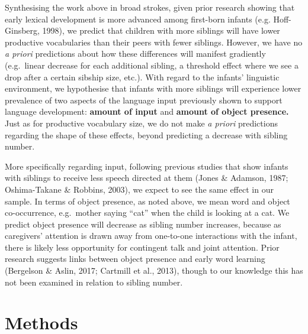 \documentclass[
  man,mask,floatsintext]{apa6}
\begin{document}
Synthesising the work above in broad strokes, given prior research showing that early lexical development is more advanced among first-born infants (e.g. Hoff-Ginsberg, 1998), we predict that children with more siblings will have lower productive vocabularies than their peers with fewer siblings. However, we have no \emph{a priori} predictions about how these differences will manifest gradiently (e.g.~linear decrease for each additional sibling, a threshold effect where we see a drop after a certain sibship size, etc.). With regard to the infants' linguistic environment, we hypothesise that infants with more siblings will experience lower prevalence of two aspects of the language input previously shown to support language development: \textbf{amount of input} and \textbf{amount of object presence.} Just as for productive vocabulary size, we do not make \emph{a priori} predictions regarding the shape of these effects, beyond predicting a decrease with sibling number.

More specifically regarding input, following previous studies that show infants with siblings to receive less speech directed at them (Jones \& Adamson, 1987; Oshima-Takane \& Robbins, 2003), we expect to see the same effect in our sample. In terms of object presence, as noted above, we mean word and object co-occurrence, e.g.~mother saying ``cat'' when the child is looking at a cat. We predict object presence will decrease as sibling number increases, because as caregivers' attention is drawn away from one-to-one interactions with the infant, there is likely less opportunity for contingent talk and joint attention. Prior research suggests links between object presence and early word learning (Bergelson \& Aslin, 2017; Cartmill et al., 2013), though to our knowledge this has not been examined in relation to sibling number.

\hypertarget{methods}{%
\section{Methods}\label{methods}}
\end{document}
